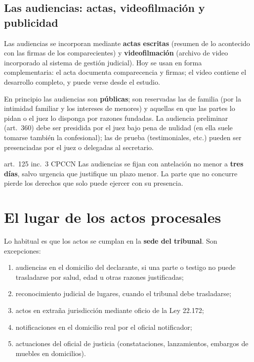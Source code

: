 \documentclass[12pt,oneside]{book}
\begin{document}
\subsection{Las audiencias: actas, videofilmación y publicidad}

Las audiencias se incorporan mediante \textbf{actas escritas} (resumen de lo acontecido con las firmas de los comparecientes) y \textbf{videofilmación} (archivo de video incorporado al sistema de gestión judicial). Hoy se usan en forma complementaria: el acta documenta comparecencia y firmas; el video contiene el desarrollo completo, y puede verse desde el estudio.

En principio las audiencias son \textbf{públicas}; son reservadas las de familia (por la intimidad familiar y los intereses de menores) y aquellas en que las partes lo pidan o el juez lo disponga por razones fundadas. La audiencia preliminar (art.~360) debe ser presidida por el juez bajo pena de nulidad (en ella suele tomarse también la confesional); las de prueba (testimoniales, etc.) pueden ser presenciadas por el juez o delegadas al secretario.

\begin{regla}{art.~125 inc.~3 CPCCN}
Las audiencias se fijan con antelación no menor a \textbf{tres días}, salvo urgencia que justifique un plazo menor. La parte que no concurre pierde los derechos que solo puede ejercer con su presencia.
\end{regla}

\section{El lugar de los actos procesales}

Lo habitual es que los actos se cumplan en la \textbf{sede del tribunal}. Son excepciones:

\begin{enumerate}[label=\alph*)]
\item audiencias en el domicilio del declarante, si una parte o testigo no puede trasladarse por salud, edad u otras razones justificadas;
\item reconocimiento judicial de lugares, cuando el tribunal debe trasladarse;
\item actos en extraña jurisdicción mediante oficio de la Ley 22.172;
\item notificaciones en el domicilio real por el oficial notificador;
\item actuaciones del oficial de justicia (constataciones, lanzamientos, embargos de muebles en domicilios).
\end{enumerate}
\end{document}
